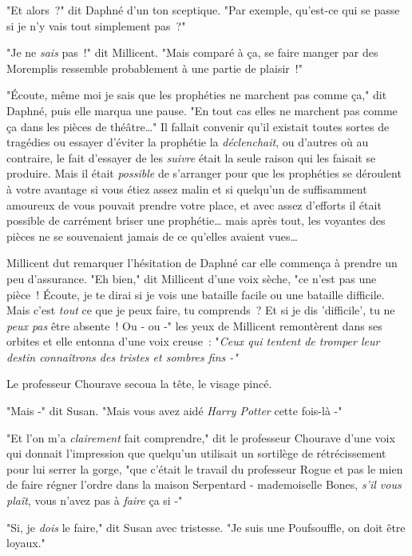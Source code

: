 "Et alors~?" dit Daphné d'un ton sceptique. "Par exemple, qu'est-ce qui se passe si je n'y vais tout simplement pas~?"

"Je ne \emph{sais} pas~!" dit Millicent. "Mais comparé à ça, se faire manger par des Moremplis ressemble probablement à une partie de plaisir~!"

"Écoute, même moi je sais que les prophéties ne marchent pas comme ça," dit Daphné, puis elle marqua une pause. "En tout cas elles ne marchent pas comme ça dans les pièces de théâtre…" Il fallait convenir qu'il existait toutes sortes de tragédies ou essayer d'éviter la prophétie la \emph{déclenchait}, ou d'autres où au contraire, le fait d'essayer de les \emph{suivre} était la seule raison qui les faisait se produire. Mais il était \emph{possible} de s'arranger pour que les prophéties se déroulent à votre avantage si vous étiez assez malin et si quelqu'un de suffisamment amoureux de vous pouvait prendre votre place, et avec assez d'efforts il était possible de carrément briser une prophétie… mais après tout, les voyantes des pièces ne se souvenaient jamais de ce qu'elles avaient vues…

Millicent dut remarquer l'hésitation de Daphné car elle commença à prendre un peu d'assurance. "Eh bien," dit Millicent d'une voix sèche, "ce n'est pas une pièce~! Écoute, je te dirai si je vois une bataille facile ou une bataille difficile. Mais c'est \emph{tout} ce que je peux faire, tu comprends~? Et si je dis 'difficile', tu ne \emph{peux pas} être absente~! Ou - ou -" les yeux de Millicent remontèrent dans ses orbites et elle entonna d'une voix creuse~: "\emph{Ceux qui tentent de tromper leur destin connaîtrons des tristes et sombres fins -"}

\later

Le professeur Chourave secoua la tête, le visage pincé.

"Mais -" dit Susan. "Mais vous avez aidé \emph{Harry Potter} cette fois-là -"

"Et l'on m'a \emph{clairement} fait comprendre," dit le professeur Chourave d'une voix qui donnait l'impression que quelqu'un utilisait un sortilège de rétrécissement pour lui serrer la gorge, "que c'était le travail du professeur Rogue et pas le mien de faire régner l'ordre dans la maison Serpentard - mademoiselle Bones, \emph{s'il vous plaît}, vous n'avez pas à \emph{faire} ça si -"

"Si, je \emph{dois} le faire," dit Susan avec tristesse. "Je suis une Poufsouffle, on doit être loyaux."

